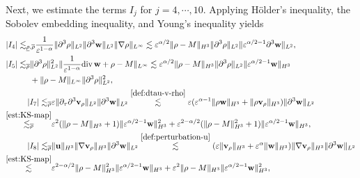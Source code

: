 \documentclass[11pt]{article}
\theoremstyle{plain}
\theoremstyle{definition}
\theoremstyle{remark}
\newcommand{\dtau}{\partial_\tau}
\newcommand{\dv}{\mathrm{div}\, }
\renewcommand{\vec}[1]{{\bf #1}}
\newcommand{\norm}[2]{\Vert #1 \Vert_{#2}}
\numberwithin{equation}{section}
\begin{document}
Next, we estimate the terms $ I_j $ for $ j = 4, \cdots, 10 $. 
Applying H\"older's inequality, the Sobolev embedding inequality, and Young's inequality yields
\begin{align}
    \label{est:101-01}
    & \begin{aligned}
        \vert I_4 \vert \lesssim_{\underline\rho, \overline\rho} & \frac{1}{\varepsilon^{1-\alpha}} \norm{\partial^3 \rho}{L^2} \norm{\partial^3 \vec w}{L^2} \norm{\nabla \rho}{L^\infty} \lesssim \varepsilon^{\alpha/2} \norm{\rho - M}{H^3} \norm{\partial^3\rho}{L^2} \norm{\varepsilon^{\alpha/2-1} \partial^3 \vec w}{L^2}, 
    \end{aligned} \\
    \label{est:101-02}
    & \begin{aligned}
        \vert I_5 \vert \lesssim_{\overline\rho} & \norm{\partial^3 \rho}{L^2}^2 \norm{ \frac{1}{\varepsilon^{1-\alpha}}\dv \vec w + \rho - M}{L^\infty} \lesssim \varepsilon^{\alpha/2} \norm{\rho - M}{H^3} \norm{\partial^3 \rho}{L^2}\norm{\varepsilon^{\alpha/2-1} \vec w}{H^3} \\
        & + \norm{\rho-M}{L^\infty} \norm{\partial^3\rho}{L^2}^2,
    \end{aligned}\\
    \label{est:101-03}
    & \begin{aligned}
        \vert I_7 \vert \lesssim_{\overline \rho} & \varepsilon \norm{\dtau\partial^3\vec v_\rho}{L^2} \norm{\partial^3 \vec w}{L^2} \stackrel{\eqref{def:dtau-v-rho}}\lesssim \varepsilon (\varepsilon^{\alpha -1} \norm{\rho \vec w}{H^3} + \norm{\rho \vec v_\rho}{H^3}) \norm{\partial^3 \vec w}{L^2} \\
        \stackrel{\eqref{est:KS-map}}{\lesssim_{\overline\rho}} & \varepsilon^2 (\norm{\rho-M}{H^3} + 1) \norm{\varepsilon^{\alpha/2-1}\vec w}{H^3}^2 + \varepsilon^{2-\alpha/2} (\norm{\rho - M}{H^3}^2 + 1) \norm{\varepsilon^{\alpha/2-1}\vec w}{H^3},
    \end{aligned}\\
    \label{est:101-04}
    & \begin{aligned}
        \vert I_8 \vert \lesssim_{\overline\rho} & \norm{\vec u}{H^3}\norm{\nabla\vec v_\rho}{H^3} \norm{\partial^3 \vec w}{L^2} \stackrel{\eqref{def:perturbation-u}}{\lesssim}  (\varepsilon \norm{\vec v_\rho}{H^3} + \varepsilon^\alpha\norm{\vec w}{H^3} ) \norm{\nabla\vec v_\rho}{H^3} \norm{\partial^3 \vec w}{L^2} \\
        \stackrel{\eqref{est:KS-map}}{\lesssim} & \varepsilon^{2-\alpha/2} \norm{\rho-M}{H^3}^2 \norm{\varepsilon^{\alpha/2-1}\vec w}{H^3} + \varepsilon^2 \norm{\rho-M}{H^3} \norm{\varepsilon^{\alpha/2-1}\vec w}{H^3}^2,

\end{aligned}
\end{align}
\end{document}

